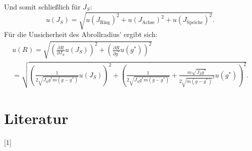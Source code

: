 \documentclass[11pt,a4paper,titlepage, ngerman]{article}
\begin{document}
	Und somit schließlich für $J_S$:
	\begin{equation*}
		u(J_S)= \sqrt{u(J_\text{Ring})^2 + u(J_\text{Achse})^2 + u(J_\text{Speiche})^2}.
	\end{equation*}
	Für die Unsicherheit des Abrollradius' ergibt sich:
	\begin{align*}
		u(R) = \sqrt{\left( \frac{\partial R}{\partial J_S}u(J_S)\right)^2 + \left(\frac{\partial R}{\partial g^{*}}u(g^{*})\right) ^2} \\
		= \sqrt{\left( \frac{1}{2\sqrt{J_S g^{*} m(g-g^{*})}}u(J_S)\right)^2 + \left(\frac{1}{2\sqrt{J_S g^{*} m(g-g^{*})}}+\frac{m\sqrt{J_S g^{*}}}{2\sqrt{m(g-g^{*})}^3} u(g^{*})\right) ^2}.
	\end{align*}
	\section*{Literatur}
	
	[1] 
	
\end{document}

